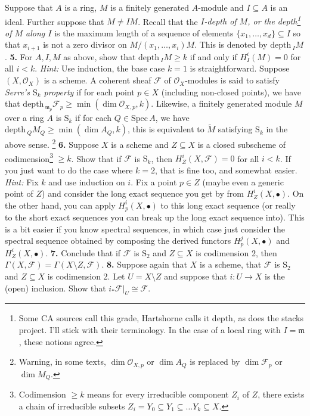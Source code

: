 \documentclass[11pt]{amsart}
\theoremstyle{theorem}
\renewcommand{\O}{\mathcal O}
\renewcommand{\to}[1][]{\xrightarrow{\ #1\ }}
\newcommand{\depth}{\mathrm{depth}\,}
\newcommand{\Spec}{\mathrm{Spec}\,}
\newcommand{\cF}{\mathcal{F}}
\newcommand{\fram}{\mathfrak{m}}
\begin{document}
\vskip 3pt
Suppose that $A$ is a ring, $M$ is a finitely generated $A$-module and $I \subseteq A$ is an ideal.  Further suppose that $M \neq I M$.  Recall that the \emph{$I$-depth of $M$, or the depth\footnote{Some CA sources call this grade, Hartshorne calls it depth, as does the stacks project.  I'll stick with their terminology.  In the case of a local ring with $I = \fram$, these notions agree.} of $M$ along $I$} is the maximum length of a sequence of elements $\{x_1, \dots, x_d\} \subseteq I$ so that $x_{i+1}$ is not a zero divisor on $M/(x_1, \dots, x_{i})M$.  This is denoted by $\depth_I M$.
\vskip 9pt
\noindent
{\bf 5.}  For $A, I, M$ as above, show that $\depth_I M \geq k$ if and only if $H^i_I(M) = 0$ for all $i < k$.  
\vskip 3pt
\emph{Hint:} Use induction, the base case $k = 1$ is straightforward.
\newpage
Suppose $(X, \O_X)$ is a scheme.  A coherent sheaf $\cF$ of $\O_X$-modules is said to satisfy \emph{Serre's $\mathrm{S}_k$ property} if for each point $p \in X$ (including non-closed points), we have that $\depth_{\fram_p} \cF_p \geq \min(\dim \O_{X,p}, k)$.  Likewise, a finitely generated module $M$ over a ring $A$ is $\mathrm{S}_k$ if for each $Q \in \Spec A$, we have $\depth_Q M_Q \geq \min(\dim A_Q, k)$, this is equivalent to $\widetilde M$ satisfying $\mathrm{S}_k$ in the above sense.  \footnote{Warning, in some texts, $\dim \O_{X,p}$ or $\dim A_Q$ is replaced by $\dim \cF_p$ or $\dim M_Q$.}
\vskip 9pt
\noindent
{\bf 6.}  Suppose $X$ is a scheme and $Z \subseteq X$ is a closed subscheme of codimension\footnote{Codimension $\geq k$ means for every irreducible component $Z_i$ of $Z$, there exists a chain of irreducible subsets $Z_i = Y_0 \subseteq Y_1 \subseteq \dots Y_k \subseteq X$.} $\geq k$.  Show that if $\cF$ is $\mathrm{S}_k$, then $H^i_Z(X, \cF) = 0$ for all $i < k$.  If you just want to do the case where $k = 2$, that is fine too, and somewhat easier.  
\vskip 3pt
\emph{Hint:} Fix $k$ and use induction on $i$.  Fix a point $p \in Z$ (maybe even a generic point of $Z$) and consider the long exact sequence you get by from $H^i_Z(X, \bullet)$.  On the other hand, you can apply $H^i_p(X, \bullet)$ to this long exact sequence (or really to the short exact sequences you can break up the long exact sequence into).  This is a bit easier if you know spectral sequences, in which case just consider the spectral sequence obtained by composing the derived functors $H^j_p(X, \bullet)$ and $H^i_Z(X, \bullet)$.
\newpage
\noindent
{\bf 7.}  Conclude that if $\cF$ is $\mathrm{S}_2$ and $Z \subseteq X$ is codimension 2, then $\Gamma(X, \cF) = \Gamma(X \setminus Z, \cF)$.
\vskip 250pt
\noindent
{\bf 8.}  Suppose again that $X$ is a scheme, that $\cF$ is $\mathrm{S}_2$ and $Z \subseteq X$ is codimension 2.  Let $U = X \setminus Z$ and suppose that $i : U \to X$ is the (open) inclusion.  Show that $i_* \cF|_U \cong \cF$.  
\end{document}
